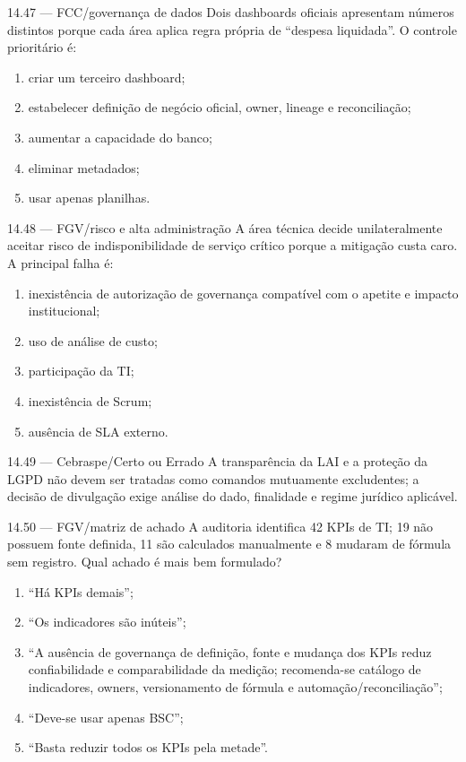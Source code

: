 \begin{questao}{ 14.47 — FCC/governança de dados}
Dois dashboards oficiais apresentam números distintos porque cada área aplica regra própria de ``despesa liquidada''. O controle prioritário é:
\begin{enumerate}[label=\Alph*)]
\item criar um terceiro dashboard;
\item estabelecer definição de negócio oficial, owner, lineage e reconciliação;
\item aumentar a capacidade do banco;
\item eliminar metadados;
\item usar apenas planilhas.
\end{enumerate}
\end{questao}

\begin{questao}{ 14.48 — FGV/risco e alta administração}
A área técnica decide unilateralmente aceitar risco de indisponibilidade de serviço crítico porque a mitigação custa caro. A principal falha é:
\begin{enumerate}[label=\Alph*)]
\item inexistência de autorização de governança compatível com o apetite e impacto institucional;
\item uso de análise de custo;
\item participação da TI;
\item inexistência de Scrum;
\item ausência de SLA externo.
\end{enumerate}
\end{questao}

\begin{questao}{ 14.49 — Cebraspe/Certo ou Errado}
A transparência da LAI e a proteção da LGPD não devem ser tratadas como comandos mutuamente excludentes; a decisão de divulgação exige análise do dado, finalidade e regime jurídico aplicável.
\end{questao}

\begin{questao}{ 14.50 — FGV/matriz de achado}
A auditoria identifica 42 KPIs de TI; 19 não possuem fonte definida, 11 são calculados manualmente e 8 mudaram de fórmula sem registro. Qual achado é mais bem formulado?
\begin{enumerate}[label=\Alph*)]
\item ``Há KPIs demais'';
\item ``Os indicadores são inúteis'';
\item ``A ausência de governança de definição, fonte e mudança dos KPIs reduz confiabilidade e comparabilidade da medição; recomenda-se catálogo de indicadores, owners, versionamento de fórmula e automação/reconciliação'';
\item ``Deve-se usar apenas BSC'';
\item ``Basta reduzir todos os KPIs pela metade''.
\end{enumerate}
\end{questao}

